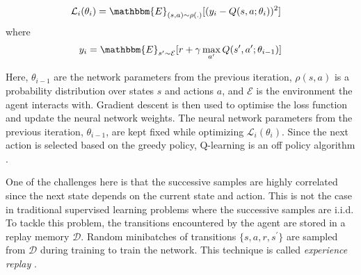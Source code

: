 \documentclass[10pt, conference]{IEEEtran}
\begin{document}
\begin{align}
\mathcal{L}_i(\theta_i)&=\mathbbm{E}_{(s,a)\sim\rho(.)}[(y_i-Q(s,a;\theta_i))^2]
\end{align}
where 
\begin{align}
    y_i=\mathbbm{E}_{s^{\prime}\sim\mathcal{E}}[r + \gamma \max\limits_{a^{\prime}}Q(s^{\prime}, a^{\prime}; \theta_{i-1})]
 \end{align}

Here, $\theta_{i-1}$ are the network parameters from the previous iteration, $\rho(s,a)$ is a probability distribution over states $s$ and actions $a$, and $\mathcal{E}$ is the environment the agent interacts with.  Gradient descent is then used to optimise the loss function and update the neural network weights. The neural network parameters from the previous iteration, $\theta_{i-1}$, are kept fixed while optimizing $\mathcal{L}_i(\theta_i)$. Since the next action is selected based on the greedy policy, Q-learning is an off policy algorithm \cite{watkins1992q}.

One of the challenges here is that the successive samples are highly correlated since the next state depends on the current state and action. This is not the case in traditional supervised learning problems where the successive samples are i.i.d. To tackle this problem, the transitions encountered by the agent are stored in a replay memory $\mathcal{D}$. Random minibatches of transitions $\{s,a,r,s^{\prime}\}$ are sampled from $\mathcal{D}$ during training to train the network. This technique is called \textit{experience replay} \cite{lin1993reinforcement}.
\end{document}
